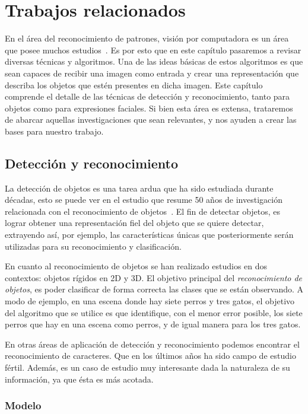 \chapter[Trabajos relacionados ]{Trabajos relacionados }\label{ch:capitulo2}

En el área del reconocimiento de patrones, visión por computadora es un área que posee muchos estudios~\cite{Andreopoulos2013}. Es por esto que en este capítulo pasaremos a revisar diversas técnicas y algoritmos. Una de las ideas básicas de estos algoritmos es que sean capaces de recibir una imagen como entrada y crear una representación que describa los objetos que estén presentes en dicha imagen. Este capítulo comprende el detalle de las técnicas de detección y reconocimiento, tanto para objetos como para expresiones faciales. Si bien esta área es extensa, trataremos de abarcar aquellas investigaciones que sean relevantes, y nos ayuden a crear las bases para nuestro trabajo.

\section{Detección y reconocimiento}
La detección de objetos es una tarea ardua que ha sido estudiada durante décadas, esto se puede ver en el estudio que resume 50 años de investigación relacionada con el reconocimiento de objetos~\cite{Andreopoulos2013}. El fin de detectar objetos, es lograr obtener una representación fiel del objeto que se quiere detectar, extrayendo así, por ejemplo, las características únicas que posteriormente serán utilizadas para su reconocimiento y clasificación.

En cuanto al reconocimiento de objetos se han realizado estudios en dos contextos: objetos rígidos en 2D y 3D\@. El objetivo principal del \textit{reconocimiento de objetos}, es poder clasificar de forma correcta las clases que se están observando. A modo de ejemplo, en una escena donde hay siete perros y tres gatos, el objetivo del algoritmo que se utilice es que identifique, con el menor error posible, los siete perros que hay en una escena como perros, y de igual manera para los tres gatos.

En otras áreas de aplicación de detección y reconocimiento podemos encontrar el reconocimiento de caracteres. Que en los últimos años ha sido campo de estudio fértil. Además, es un caso de estudio muy interesante dada la naturaleza de su información, ya que ésta es más acotada. 

\subsection{Modelo}
\label{subsec:modelo}

